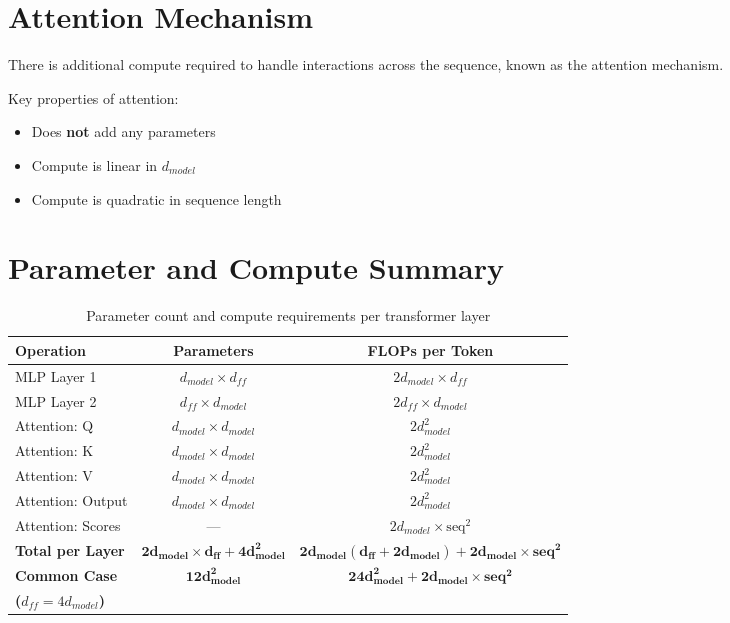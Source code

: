 \documentclass[11pt,a4paper]{article}
\begin{document}
\section{Attention Mechanism}

There is additional compute required to handle interactions across the sequence, known as the attention mechanism.

Key properties of attention:
\begin{itemize}
    \item Does \textbf{not} add any parameters
    \item Compute is linear in $d_{model}$
    \item Compute is quadratic in sequence length
\end{itemize}

\section{Parameter and Compute Summary}

\begin{table}[h]
\centering
\begin{tabular}{|l|c|c|}
\hline
\textbf{Operation} & \textbf{Parameters} & \textbf{FLOPs per Token} \\
\hline
MLP Layer 1 & $d_{model} \times d_{ff}$ & $2d_{model} \times d_{ff}$ \\
\hline
MLP Layer 2 & $d_{ff} \times d_{model}$ & $2d_{ff} \times d_{model}$ \\
\hline
Attention: Q & $d_{model} \times d_{model}$ & $2d_{model}^2$ \\
\hline
Attention: K & $d_{model} \times d_{model}$ & $2d_{model}^2$ \\
\hline
Attention: V & $d_{model} \times d_{model}$ & $2d_{model}^2$ \\
\hline
Attention: Output & $d_{model} \times d_{model}$ & $2d_{model}^2$ \\
\hline
Attention: Scores & — & $2d_{model} \times \text{seq}^2$ \\
\hline
\textbf{Total per Layer} & $\mathbf{2d_{model} \times d_{ff} + 4d_{model}^2}$ & $\mathbf{2d_{model}(d_{ff} + 2d_{model}) + 2d_{model} \times \text{seq}^2}$ \\
\hline
\textbf{Common Case} & $\mathbf{12d_{model}^2}$ & $\mathbf{24d_{model}^2 + 2d_{model} \times \text{seq}^2}$ \\
\textbf{($d_{ff} = 4d_{model}$)} & & \\
\hline
\end{tabular}
\caption{Parameter count and compute requirements per transformer layer}
\end{table}
\end{document}
